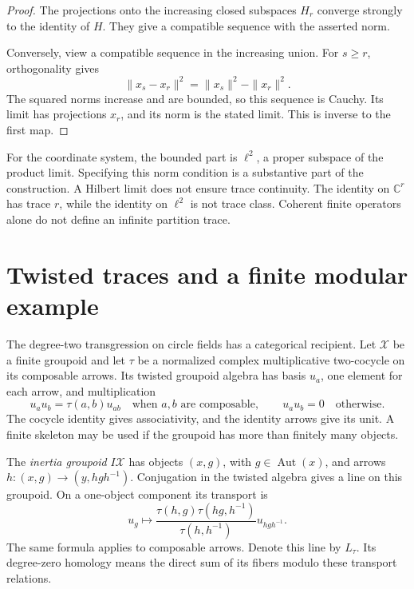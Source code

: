 \begin{proof}
The projections onto the increasing closed subspaces \(H_r\) converge
strongly to the identity of \(H\). They give a compatible sequence with the
asserted norm.

Conversely, view a compatible sequence in the increasing union. For \(s\ge
r\), orthogonality gives
\[
 \|x_s-x_r\|^2=\|x_s\|^2-\|x_r\|^2.
\]
The squared norms increase and are bounded, so this sequence is Cauchy. Its
limit has projections \(x_r\), and its norm is the stated limit. This is
inverse to the first map.
\end{proof}

For the coordinate system, the bounded part is \(\ell^2\), a proper subspace
of the product limit. Specifying this norm condition is a substantive part
of the construction. A Hilbert limit does not ensure trace continuity. The
identity on \(\mathbb C^r\) has trace \(r\), while the identity on
\(\ell^2\) is not trace class. Coherent finite operators alone do not define
an infinite partition trace.

\section{Twisted traces and a finite modular example}
\label{v4-arith:cs:twisted-trace}

The degree-two transgression on circle fields has a categorical recipient.
Let \(\mathcal X\) be a finite groupoid and let \(\tau\) be a normalized
complex multiplicative two-cocycle on its composable arrows. Its twisted
groupoid algebra has basis \(u_a\), one element for each arrow, and
multiplication
\[
 u_a u_b=\tau(a,b)u_{ab}
       \quad\text{when }a,b\text{ are composable},
 \qquad u_a u_b=0\quad\text{otherwise}.
\]
The cocycle identity gives associativity, and the identity arrows give its
unit. A finite skeleton may be used if the groupoid has more than finitely
many objects.

The \emph{inertia groupoid} \(I\mathcal X\) has objects \((x,g)\), with
\(g\in\operatorname{Aut}(x)\), and arrows \(h:(x,g)\to(y,hgh^{-1})\).
Conjugation in the twisted algebra gives a line on this groupoid. On a
one-object component its transport is
\begin{equation}
 u_g\longmapsto
 \frac{\tau(h,g)\tau(hg,h^{-1})}{\tau(h,h^{-1})}
                 u_{hgh^{-1}}.
 \label{v4-arith:cs:eq:inertia-line}
\end{equation}
The same formula applies to composable arrows. Denote this line by
\(L_\tau\). Its degree-zero homology means the direct sum of its fibers
modulo these transport relations.


